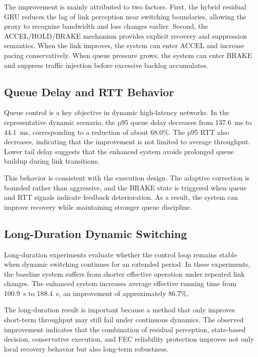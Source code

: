 The improvement is mainly attributed to two factors. First, the hybrid residual GRU reduces the lag of link perception near switching boundaries, allowing the proxy to recognize bandwidth and loss changes earlier. Second, the ACCEL/HOLD/BRAKE mechanism provides explicit recovery and suppression semantics. When the link improves, the system can enter ACCEL and increase pacing conservatively. When queue pressure grows, the system can enter BRAKE and suppress traffic injection before excessive backlog accumulates.

\subsection{Queue Delay and RTT Behavior}
Queue control is a key objective in dynamic high-latency networks. In the representative dynamic scenario, the p95 queue delay decreases from 137.6~ms to 44.1~ms, corresponding to a reduction of about 68.0\%. The p95 RTT also decreases, indicating that the improvement is not limited to average throughput. Lower tail delay suggests that the enhanced system avoids prolonged queue buildup during link transitions.

This behavior is consistent with the execution design. The adaptive correction is bounded rather than aggressive, and the BRAKE state is triggered when queue and RTT signals indicate feedback deterioration. As a result, the system can improve recovery while maintaining stronger queue discipline.

\subsection{Long-Duration Dynamic Switching}
Long-duration experiments evaluate whether the control loop remains stable when dynamic switching continues for an extended period. In these experiments, the baseline system suffers from shorter effective operation under repeated link changes. The enhanced system increases average effective running time from 100.9~s to 188.4~s, an improvement of approximately 86.7\%.

The long-duration result is important because a method that only improves short-term throughput may still fail under continuous dynamics. The observed improvement indicates that the combination of residual perception, state-based decision, conservative execution, and FEC reliability protection improves not only local recovery behavior but also long-term robustness.
